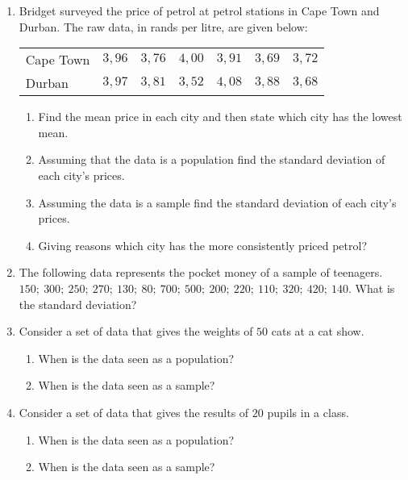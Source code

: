 {
\begin{enumerate}
\item Bridget surveyed the price of petrol at petrol stations in Cape Town and Durban. The raw data, in rands per litre, are given below:
\begin{center}
\begin{tabular}{lllllll}
Cape Town & $3,96$ & $3,76$ & $4,00$ & $3,91$ & $3,69$ & $3,72$ \\
Durban    & $3,97$ & $3,81$ & $3,52$ & $4,08$ & $3,88$ & $3,68$ \\ 
\end{tabular}
\end{center}
	\begin{enumerate}
	\item Find the mean price in each city and then state which city has the lowest mean.
	\item Assuming that the data is a population find the standard deviation of each city's prices.
	\item Assuming the data is a sample find the standard deviation of each city's prices.
	\item Giving reasons which city has the more consistently priced petrol?
	\end{enumerate}
\item The following data represents the pocket money of a sample of teenagers. \newline
$150; ~300;~ 250;~ 270;~ 130;~ 80;~ 700;~ 500;~ 200;~ 220;~ 110;~ 320;~ 420;~ 140$. \newline
What is the standard deviation?
\item Consider a set of data that gives the weights of $50$ cats at a cat show.
	\begin{enumerate}
	\item When is the data seen as a population?
	\item When is the data seen as a sample?
	\end{enumerate}
\item Consider a set of data that gives the results of $20$ pupils in a class.
	\begin{enumerate}
	\item When is the data seen as a population?
	\item When is the data seen as a sample?
	\end{enumerate}  
\end{enumerate}
}

